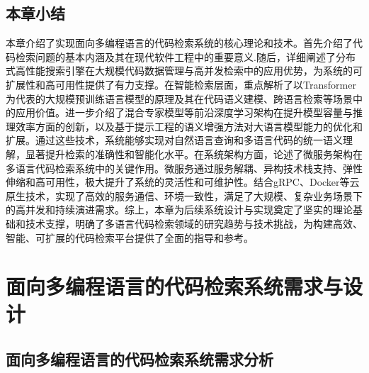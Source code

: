 \documentclass[UTF8,a4paper,12pt]{ctexart}
\numberwithin{equation}{section}
\begin{document}
\subsection{本章小结}
本章介绍了实现面向多编程语言的代码检索系统的核心理论和技术。首先介绍了代码检索问题的基本内涵及其在现代软件工程中的重要意义.随后，详细阐述了分布式高性能搜索引擎在大规模代码数据管理与高并发检索中的应用优势，为系统的可扩展性和高可用性提供了有力支撑。在智能检索层面，重点解析了以Transformer为代表的大规模预训练语言模型的原理及其在代码语义建模、跨语言检索等场景中的应用价值。进一步介绍了混合专家模型等前沿深度学习架构在提升模型容量与推理效率方面的创新，以及基于提示工程的语义增强方法对大语言模型能力的优化和扩展。通过这些技术，系统能够实现对自然语言查询和多语言代码的统一语义理解，显著提升检索的准确性和智能化水平。在系统架构方面，论述了微服务架构在多语言代码检索系统中的关键作用。微服务通过服务解耦、异构技术栈支持、弹性伸缩和高可用性，极大提升了系统的灵活性和可维护性。结合gRPC、Docker等云原生技术，实现了高效的服务通信、环境一致性，满足了大规模、复杂业务场景下的高并发和持续演进需求。综上，本章为后续系统设计与实现奠定了坚实的理论基础和技术支撑，明确了多语言代码检索领域的研究趋势与技术挑战，为构建高效、智能、可扩展的代码检索平台提供了全面的指导和参考。
\newpage
{}
\section{面向多编程语言的代码检索系统需求与设计}
\subsection{面向多编程语言的代码检索系统需求分析}
\end{document}
